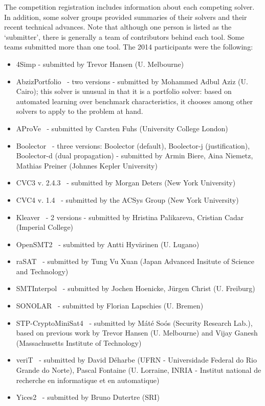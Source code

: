 \documentclass[twoside,11pt]{article}
\begin{document}
The competition registration includes information about each competing solver. In addition, some solver groups provided summaries of their solvers and their recent technical advances.
 Note that although one person is listed as the `submitter', there is generally a team of contributors behind each tool. Some teams submitted more than one tool. The 2014 participants were the following:
\begin{itemize}
\item 4Simp - submitted by Trevor Hansen (U. Melbourne)
\item AbzizPortfolio~\cite{TBD} - two versions - submitted by Mohammed Adbul Aziz (U. Cairo); this solver is unusual in that it is a portfolio solver: based on automated learning over benchmark characteristics, it chooses among other solvers to apply to the problem at hand.
\item AProVe~\cite{AProVE2014} - submitted by Carsten Fuhs (University College London)
\item Boolector~\cite{Boolector2015} - three versions: Boolector (default), Boolector-j (justification), Boolector-d (dual propagation) - submitted by Armin Biere, Aina Niemetz, Mathias Preiner (Johnnes Kepler University)
\item CVC3 v. 2.4.3~\cite{BT07} - submitted by Morgan Deters (New York University)
\item CVC4 v. 1.4~\cite{BCD+11} - submitted by the ACSys Group (New York University)
\item Kleaver~\cite{TBD} - 2 versions - submitted by Hristina Palikareva, Cristian Cadar (Imperial College)
\item OpenSMT2~\cite{TBD} - submitted by Antti Hyv\"arinen (U. Lugano)
\item raSAT~\cite{TBD} - submitted by Tung Vu Xuan (Japan Advanced Insitute of Science and Technology)
\item SMTInterpol~\cite{DBLP:conf/spin/ChristHN12,DBLP:conf/spin/2012} - submitted by Jochen Hoenicke, J\"urgen Christ (U. Freiburg)
\item SONOLAR~\cite{Peleska:2011:ATC:1986308.1986333} - submitted by Florian Lapschies (U. Bremen)
\item STP-CryptoMiniSat4~\cite{DBLP:conf/cav/GaneshD07,DBLP:conf/cav/2007} - submitted by M\'at\'e So\'os (Security Research Lab.), based on previous work by Trevor Hansen (U. Melbourne) and Vijay Ganesh (Massachusetts Institute of Technology)
\item veriT~\cite{veriT} - submitted by David D\'{e}harbe (UFRN - Universidade Federal do Rio Grande do Norte), Pascal Fontaine (U. Lorraine, INRIA - Institut national de recherche en informatique et en automatique)
\item Yices2~\cite{Dutertre:cav2014} - submitted by Bruno Dutertre (SRI)
\end{itemize}
\end{document}
